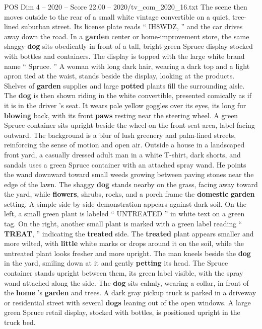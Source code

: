 \begin{textsample}{POS Dim 4 – 2020 – Score 22.00 – 2020/tv\_com\_2020\_16.txt}
The scene then moves outside to the rear of a small white vintage convertible on a quiet, tree-lined suburban street.
Its license plate reads “ IH8WDZ, ” and the car drives away down the road.
In a \textbf{garden} center or home-improvement store, the same shaggy \textbf{dog} sits obediently in front of a tall, bright green Spruce display stocked with bottles and containers.
The display is topped with the large white brand name “ Spruce. ” A woman with long dark hair, wearing a dark top and a light apron tied at the waist, stands beside the display, looking at the products.
Shelves of \textbf{garden} supplies and large \textbf{potted} plants fill the surrounding aisle.
The \textbf{dog} is then shown riding in the white convertible, presented comically as if it is in the driver ’s seat.
It wears pale yellow goggles over its eyes, its long fur \textbf{blowing} back, with its front \textbf{paws} resting near the steering wheel.
A green Spruce container sits upright beside the wheel on the front seat area, label facing outward.
The background is a blur of lush greenery and palm-lined streets, reinforcing the sense of motion and open air.
Outside a house in a landscaped front yard, a casually dressed adult man in a white T-shirt, dark shorts, and sandals uses a green Spruce container with an attached spray wand.
He points the wand downward toward small weeds growing between paving stones near the edge of the lawn.
The shaggy \textbf{dog} stands nearby on the grass, facing away toward the yard, while \textbf{flowers}, shrubs, rocks, and a porch frame the \textbf{domestic} \textbf{garden} setting.
A simple side-by-side demonstration appears against dark soil.
On the left, a small green plant is labeled “ UNTREATED ” in white text on a green tag.
On the right, another small plant is marked with a green label reading “ \textbf{TREAT}, ” indicating the \textbf{treated} side.
The \textbf{treated} plant appears smaller and more wilted, with \textbf{little} white marks or drops around it on the soil, while the untreated plant looks fresher and more upright.
The man kneels beside the \textbf{dog} in the yard, smiling down at it and gently \textbf{petting} its head.
The Spruce container stands upright between them, its green label visible, with the spray wand attached along the side.
The \textbf{dog} sits calmly, wearing a collar, in front of the \textbf{home} ’s \textbf{garden} and trees.
A dark gray pickup truck is parked in a driveway or residential street with several \textbf{dogs} leaning out of the open windows.
A large green Spruce retail display, stocked with bottles, is positioned upright in the truck bed.

\end{textsample}
